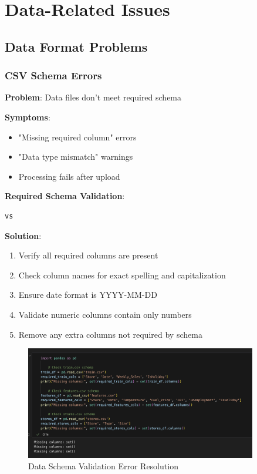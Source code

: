\section{Data-Related Issues}

\subsection{Data Format Problems}

\subsubsection{CSV Schema Errors}

\textbf{Problem}: Data files don't meet required schema

\textbf{Symptoms}:
\begin{itemize}
	\item "Missing required column" errors
	\item "Data type mismatch" warnings
	\item Processing fails after upload
\end{itemize}

\textbf{Required Schema Validation}:
\begin{lstlisting}[language=python]
vs
\end{lstlisting}

\textbf{Solution}:
\begin{enumerate}
	\item Verify all required columns are present
	\item Check column names for exact spelling and capitalization
	\item Ensure date format is YYYY-MM-DD
	\item Validate numeric columns contain only numbers
	\item Remove any extra columns not required by schema
\end{enumerate}

\begin{figure}[H]
	\centering
	\includegraphics[width=0.9\textwidth]{Images/08Troubleshooting/DataSchemaValidation.png}
	\caption{Data Schema Validation Error Resolution}
	\label{fig:data_schema_validation}
\end{figure}

